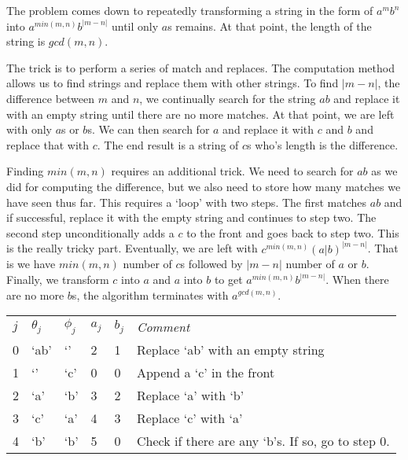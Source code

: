 The problem comes down to repeatedly transforming a string in the form of $a^{m}b^{n}$
into $a^{min(m, n)}b^{|m - n|}$ until only $a$s remains. At that point, the length of
the string is $gcd(m, n)$. 

The trick is to perform a series of match and replaces. The
computation method allows us to find strings and replace them with other strings. To find
$|m - n|$, the difference between $m$ and $n$, we continually search for the string $ab$
and replace it with an empty string until there are no more matches. At that point,
we are left with only $a$s or $b$s. We can then search for $a$ and replace it with $c$
and $b$ and replace that with $c$. The end result is a string of $c$s who's length is
the difference.

Finding $min(m, n)$ requires an additional trick. We need to search for $ab$ as we did
for computing the difference, but we also need to store how many matches we have seen
thus far. This requires a `loop' with two steps. The first matches $ab$ and if successful,
replace it with the empty string and continues to step two. The second step unconditionally
adds a $c$ to the front and goes back to step two. This is the really tricky part. Eventually, 
we are left with $c^{min(m, n)}(a|b)^{|m - n|}$. That is we have $min(m, n)$ number of $c$s 
followed by $|m - n|$ number of $a$ or $b$. Finally, we transform $c$ into $a$ and $a$ 
into $b$ to get $a^{min(m, n)}b^{|m - n|}$. When there are no more $b$s, the algorithm
terminates with $a^{gcd(m, n)}$.

\begin{tabular}{llllll}
	$j$ & $\theta_{j}$ & $\phi_{j}$ & $a_{j}$ & $b_{j}$ & \emph{Comment} \\
	0 & `ab' & `' & 2 & 1 & Replace `ab' with an empty string \\
	1 & `' & `c' & 0 & 0 & Append a `c' in the front \\
	2 & `a' & `b' & 3 & 2 & Replace `a' with `b' \\
	3 & `c' & `a' & 4 & 3 & Replace `c' with `a' \\
	4 & `b' & `b' & 5 & 0 & Check if there are any `b's. If so, go to step 0. \\
\end{tabular}
